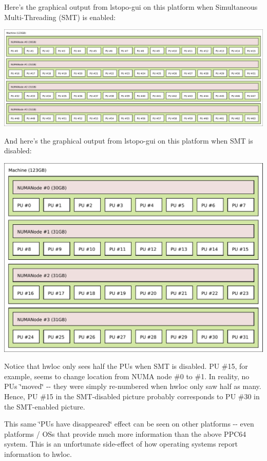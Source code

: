 Here's the graphical output from lstopo-\/gui on this platform when Simultaneous Multi-\/Threading (SMT) is enabled:

 
\begin{DoxyImageNoCaption}
  \mbox{\includegraphics[width=\textwidth]{ppc64-with-smt}}
\end{DoxyImageNoCaption}


And here's the graphical output from lstopo-\/gui on this platform when SMT is disabled:

 
\begin{DoxyImageNoCaption}
  \mbox{\includegraphics[width=\textwidth]{ppc64-without-smt}}
\end{DoxyImageNoCaption}


Notice that hwloc only sees half the PUs when SMT is disabled. PU \#15, for example, seems to change location from NUMA node \#0 to \#1. In reality, no PUs \char`\"{}moved\char`\"{} -\/-\/ they were simply re-\/numbered when hwloc only saw half as many. Hence, PU \#15 in the SMT-\/disabled picture probably corresponds to PU \#30 in the SMT-\/enabled picture.

This same \char`\"{}PUs have disappeared\char`\"{} effect can be seen on other platforms -\/-\/ even platforms / OSs that provide much more information than the above PPC64 system. This is an unfortunate side-\/effect of how operating systems report information to hwloc.


